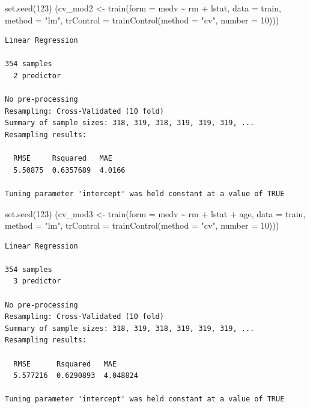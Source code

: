 \documentclass[
  8pt,
  ignorenonframetext,
]{beamer}
\newenvironment{Shaded}{\begin{snugshade}}{\end{snugshade}}
\newcommand{\AttributeTok}[1]{\textcolor[rgb]{0.77,0.63,0.00}{#1}}
\newcommand{\DecValTok}[1]{\textcolor[rgb]{0.00,0.00,0.81}{#1}}
\newcommand{\FunctionTok}[1]{\textcolor[rgb]{0.00,0.00,0.00}{#1}}
\newcommand{\NormalTok}[1]{#1}
\newcommand{\OtherTok}[1]{\textcolor[rgb]{0.56,0.35,0.01}{#1}}
\newcommand{\SpecialCharTok}[1]{\textcolor[rgb]{0.00,0.00,0.00}{#1}}
\newcommand{\StringTok}[1]{\textcolor[rgb]{0.31,0.60,0.02}{#1}}
\begin{document}
\begin{frame}[fragile]
\footnotesize

\begin{Shaded}
\begin{Highlighting}[]
\FunctionTok{set.seed}\NormalTok{(}\DecValTok{123}\NormalTok{)  }
\NormalTok{(cv\_mod2 }\OtherTok{\textless{}{-}} \FunctionTok{train}\NormalTok{(}\AttributeTok{form =}\NormalTok{ medv }\SpecialCharTok{\textasciitilde{}}\NormalTok{ rm }\SpecialCharTok{+}\NormalTok{ lstat, }
  \AttributeTok{data =}\NormalTok{ train, }\AttributeTok{method =} \StringTok{"lm"}\NormalTok{,}
  \AttributeTok{trControl =} \FunctionTok{trainControl}\NormalTok{(}\AttributeTok{method =} \StringTok{"cv"}\NormalTok{, }\AttributeTok{number =} \DecValTok{10}\NormalTok{)))}
\end{Highlighting}
\end{Shaded}

\begin{verbatim}
Linear Regression 

354 samples
  2 predictor

No pre-processing
Resampling: Cross-Validated (10 fold) 
Summary of sample sizes: 318, 319, 318, 319, 319, 319, ... 
Resampling results:

  RMSE     Rsquared   MAE   
  5.50875  0.6357689  4.0166

Tuning parameter 'intercept' was held constant at a value of TRUE
\end{verbatim}

\normalsize
\end{frame}

\begin{frame}[fragile]
\footnotesize

\begin{Shaded}
\begin{Highlighting}[]
\FunctionTok{set.seed}\NormalTok{(}\DecValTok{123}\NormalTok{)  }
\NormalTok{(cv\_mod3 }\OtherTok{\textless{}{-}} \FunctionTok{train}\NormalTok{(}\AttributeTok{form =}\NormalTok{ medv }\SpecialCharTok{\textasciitilde{}}\NormalTok{ rm }\SpecialCharTok{+}\NormalTok{ lstat }\SpecialCharTok{+}\NormalTok{ age, }
  \AttributeTok{data =}\NormalTok{ train, }\AttributeTok{method =} \StringTok{"lm"}\NormalTok{,}
  \AttributeTok{trControl =} \FunctionTok{trainControl}\NormalTok{(}\AttributeTok{method =} \StringTok{"cv"}\NormalTok{, }\AttributeTok{number =} \DecValTok{10}\NormalTok{)))}
\end{Highlighting}
\end{Shaded}

\begin{verbatim}
Linear Regression 

354 samples
  3 predictor

No pre-processing
Resampling: Cross-Validated (10 fold) 
Summary of sample sizes: 318, 319, 318, 319, 319, 319, ... 
Resampling results:

  RMSE      Rsquared   MAE     
  5.577216  0.6290893  4.048824

Tuning parameter 'intercept' was held constant at a value of TRUE
\end{verbatim}

\normalsize
\end{frame}
\end{document}
